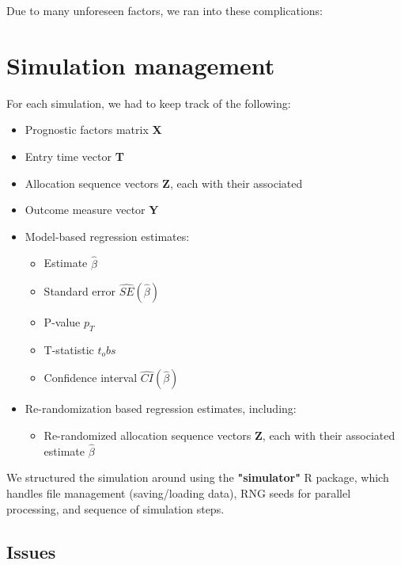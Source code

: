 Due to many unforeseen factors, we ran into these complications:

\section{Simulation management}
For each simulation, we had to keep track of the following:
\begin{itemize}
	\item Prognostic factors matrix \textbf{X}
	\item Entry time vector \textbf{T}
	\item Allocation sequence vectors \textbf{Z}, each with their associated
	\item Outcome measure vector \textbf{Y}
	\item Model-based regression estimates:
		\begin{itemize}
		\item Estimate $\hat{\beta}$
		\item Standard error $\hat{SE}(\hat{\beta})$
		\item P-value $p_T$
		\item T-statistic $t_obs$	
		\item Confidence interval $\hat{CI}(\hat{\beta})$
		\end{itemize}
	\item Re-randomization based regression estimates, including:
		\begin{itemize}
			\item Re-randomized allocation sequence vectors \textbf{Z}, each with their associated estimate $\hat{\beta}$
		\end{itemize}
\end{itemize}
We structured the simulation around using the \textbf{"simulator"} R package, which handles file management (saving/loading data), RNG seeds for parallel processing, and sequence of simulation steps.

\subsection{Issues}
